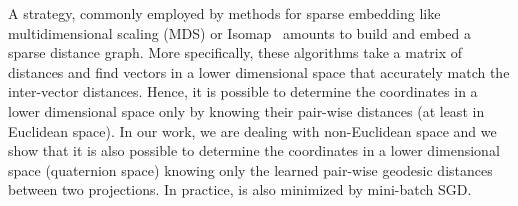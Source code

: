 A strategy, commonly employed by methods for sparse embedding like multidimensional scaling (MDS) or Isomap~\cite{platt2004fast, 5438584,DBLP:journals/corr/abs-1811-10470} amounts to build and embed a sparse distance graph.
More specifically, these algorithms take a matrix of distances and find vectors in a lower dimensional space that accurately match the inter-vector distances.
Hence, it is possible to determine the coordinates in a lower dimensional space only by knowing their pair-wise distances (at least in Euclidean space).
In our work, we are dealing with non-Euclidean space and we show that it is also possible to determine the coordinates in a lower dimensional space (quaternion space) knowing only the learned pair-wise geodesic distances between two projections.
In practice,  is also minimized by mini-batch SGD.
